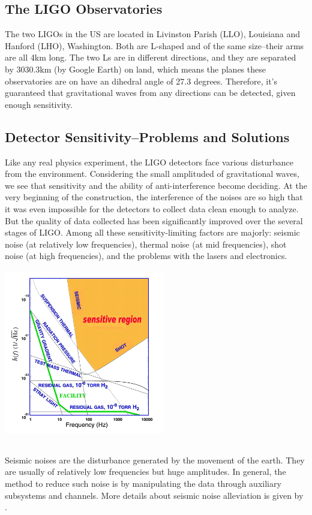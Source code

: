 \documentclass[aps,prl,preprint]{revtex4}
\begin{document}
\subsection{The LIGO Observatories}
The two LIGOs in the US are located in Livinston Parish (LLO), Louisiana and Hanford (LHO), Washington. Both are L-shaped and of the same size--their arms are all 4km long. The two Ls are in different directions, and they are separated by 3030.3km (by Google Earth) on land, which means the planes these observatories are on have an dihedral angle of 27.3 degrees. Therefore, it's guaranteed that gravitational waves from any directions can be detected, given enough sensitivity.

\subsection{Detector Sensitivity--Problems and Solutions}
Like any real physics experiment, the LIGO detectors face various disturbance from the environment. Considering the small amplituded of gravitational waves, we see that sensitivity and the ability of anti-interference become deciding. At the very beginning of the construction, the interference of the noises are so high that it was even impossible for the detectors to collect data clean enough to analyze. But the quality of data collected has been significantly improved over the several stages of LIGO. Among all these sensitivity-limiting factors are majorly: seismic noise (at relatively low frequencies), thermal noise (at mid frequencies), shot noise (at high frequencies), and the problems with the lasers and electronics. \newline\includegraphics[height=8cm, width=7cm]{SensitiveGraph}

Seismic noises are the disturbance generated by the movement of the earth. They are usually of relatively low frequencies but huge amplitudes. In general, the method to reduce such noise is by manipulating the data through auxiliary subsystems and channels. More details about seismic noise alleviation is given by \cite{seismic}.
\end{document}
